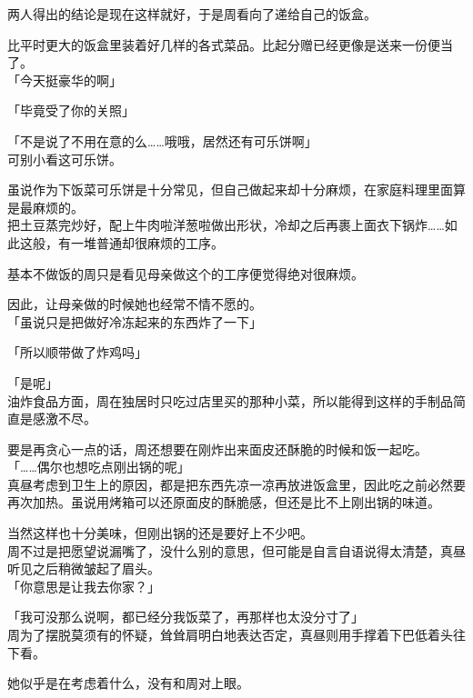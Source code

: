两人得出的结论是现在这样就好，于是周看向了递给自己的饭盒。

比平时更大的饭盒里装着好几样的各式菜品。比起分赠已经更像是送来一份便当了。\\

「今天挺豪华的啊」

「毕竟受了你的关照」

「不是说了不用在意的么……哦哦，居然还有可乐饼啊」\\

可别小看这可乐饼。

虽说作为下饭菜可乐饼是十分常见，但自己做起来却十分麻烦，在家庭料理里面算是最麻烦的。\\

把土豆蒸完炒好，配上牛肉啦洋葱啦做出形状，冷却之后再裹上面衣下锅炸……如此这般，有一堆普通却很麻烦的工序。

基本不做饭的周只是看见母亲做这个的工序便觉得绝对很麻烦。

因此，让母亲做的时候她也经常不情不愿的。\\

「虽说只是把做好冷冻起来的东西炸了一下」

「所以顺带做了炸鸡吗」

「是呢」\\

油炸食品方面，周在独居时只吃过店里买的那种小菜，所以能得到这样的手制品简直是感激不尽。

要是再贪心一点的话，周还想要在刚炸出来面皮还酥脆的时候和饭一起吃。\\

「……偶尔也想吃点刚出锅的呢」\\

真昼考虑到卫生上的原因，都是把东西先凉一凉再放进饭盒里，因此吃之前必然要再次加热。虽说用烤箱可以还原面皮的酥脆感，但还是比不上刚出锅的味道。

当然这样也十分美味，但刚出锅的还是要好上不少吧。\\

周不过是把愿望说漏嘴了，没什么别的意思，但可能是自言自语说得太清楚，真昼听见之后稍微皱起了眉头。\\

「你意思是让我去你家？」

「我可没那么说啊，都已经分我饭菜了，再那样也太没分寸了」\\

周为了摆脱莫须有的怀疑，耸耸肩明白地表达否定，真昼则用手撑着下巴低着头往下看。

她似乎是在考虑着什么，没有和周对上眼。\\

